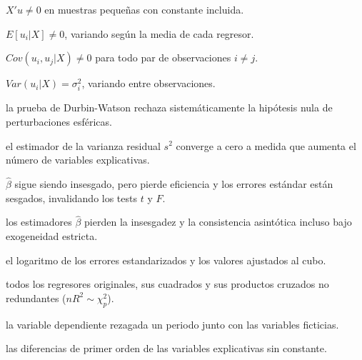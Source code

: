 \begin{opts}
    \item $X'u \neq 0$ en muestras pequeñas con constante incluida.
    \item $E[u_i|X] \neq 0$, variando según la media de cada regresor.
    \item $Cov(u_i, u_j|X) \neq 0$ para todo par de observaciones $i \neq j$.
    \item $Var(u_i|X) = \sigma_i^2$, variando entre observaciones.
\end{opts}

\begin{opts}
    \item la prueba de Durbin-Watson rechaza sistemáticamente la hipótesis nula de perturbaciones esféricas.
    \item el estimador de la varianza residual $s^2$ converge a cero a medida que aumenta el número de variables explicativas.
    \item $\hat{\beta}$ sigue siendo insesgado, pero pierde eficiencia y los errores estándar están sesgados, invalidando los tests $t$ y $F$.
    \item los estimadores $\hat{\beta}$ pierden la insesgadez y la consistencia asintótica incluso bajo exogeneidad estricta.
\end{opts}

\begin{opts}
    \item el logaritmo de los errores estandarizados y los valores ajustados al cubo.
    \item todos los regresores originales, sus cuadrados y sus productos cruzados no redundantes ($n R^2 \sim \chi^2_p$).
    \item la variable dependiente rezagada un periodo junto con las variables ficticias.
    \item las diferencias de primer orden de las variables explicativas sin constante.
\end{opts}

